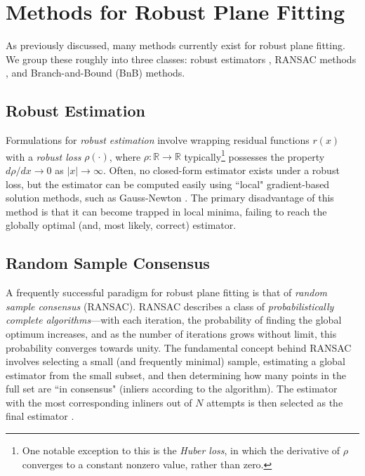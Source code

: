 \documentclass[conference]{IEEEtran}
\begin{document}
\section{Methods for Robust Plane Fitting}

As previously discussed, many methods currently exist for robust plane fitting.  We group these roughly into three classes: robust estimators \cite{gradients}, RANSAC methods \cite{ransac}, and Branch-and-Bound (BnB) \cite{bnb} methods.

\subsection{Robust Estimation}

Formulations for \textit{robust estimation} involve wrapping residual functions \( r(x) \) with a \textit{robust loss} \( \rho(\cdot) \), where \( \rho: \mathbb{R} \rightarrow \mathbb{R} \) typically\footnote{One notable exception to this is the \textit{Huber loss}, in which the derivative of \( \rho \) converges to a constant nonzero value, rather than zero.} possesses the property \( d \rho/dx \rightarrow 0 \) as \( \left\vert x \right\vert \rightarrow \infty \).  Often, no closed-form estimator exists under a robust loss, but the estimator can be computed easily using ``local" gradient-based solution methods, such as Gauss-Newton \cite{gradients}.  The primary disadvantage of this method is that it can become trapped in local minima, failing to reach the globally optimal (and, most likely, correct) estimator.

\subsection{Random Sample Consensus}

A frequently successful paradigm for robust plane fitting is that of \textit{random sample consensus} (RANSAC).  RANSAC describes a class of \textit{probabilistically complete algorithms}---with each iteration, the probability of finding the global optimum increases, and as the number of iterations grows without limit, this probability converges towards unity.  The fundamental concept behind RANSAC involves selecting a small (and frequently minimal) sample, estimating a global estimator from the small subset, and then determining how many points in the full set are ``in consensus" (inliers according to the algorithm).  The estimator with the most corresponding inliners out of \( N \) attempts is then selected as the final estimator \cite{ransac}.
\end{document}
